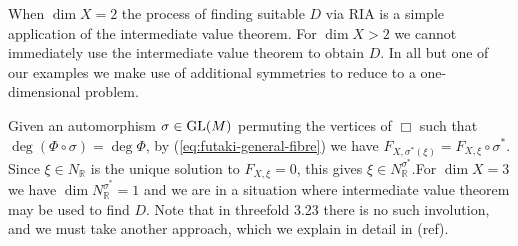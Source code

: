 When \(\dim  X = 2\) the process of finding suitable \(D\) via RIA is a simple application of the intermediate value theorem. For \(\dim X >2 \) we cannot immediately use the intermediate value theorem to obtain \(D\). In all but one of our examples we make use of additional symmetries to reduce to a one-dimensional problem.

Given an automorphism \(\sigma \in \operatorname{GL}(M)\) permuting the vertices of \(\Box\) such that \(\deg (\Phi \circ \sigma) = \deg \Phi\), by (\ref{eq:futaki-general-fibre}) we have $F_{X, \sigma^{\!*}\!(\xi)}  =  F_{X, \xi}\circ \sigma^*$. Since \(\xi \in N_\mathbb{R}\) is the unique solution to \(F_{X,\xi} = 0\), this gives \(\xi \in N_{\mathbb{R}}^{\sigma^*}\).For \(\dim X = 3\) we have \(\dim N_{\mathbb{R}}^{\sigma^*}  = 1\) and we are in a situation where intermediate value theorem may be used to find \(D\). Note that in threefold 3.23 there is no such involution, and we must take another approach, which we explain in detail in (ref).

